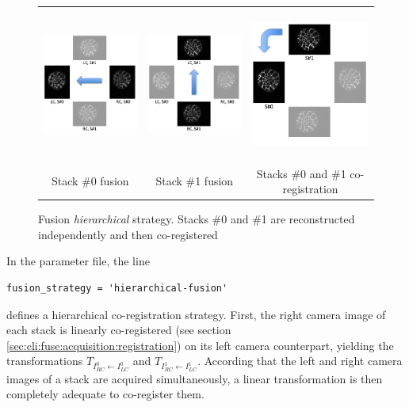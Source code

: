 \begin{figure}
\begin{center}
\begin{tabular}{ccc}
\includegraphics[height=50mm]{figures/fusion-hierarchical-strategy-1.png} &
\includegraphics[height=50mm]{figures/fusion-hierarchical-strategy-2.png} &
\includegraphics[height=50mm]{figures/fusion-hierarchical-strategy-3.png} \\
Stack \#0 fusion &
Stack \#1 fusion &
Stacks \#0 and \#1 co-registration
\end{tabular}
\end{center}
\caption{\label{fig:cli:fuse:hierarchical:strategy} Fusion \textit{hierarchical} strategy. Stacks \#0 and \#1 are reconstructed independently and then co-registered}
\end{figure}

In the parameter file, the line
\begin{verbatim}
fusion_strategy = 'hierarchical-fusion'
\end{verbatim}
defines a hierarchical  co-registration  strategy. First, the right camera image of each stack is linearly co-registered (see section \ref{sec:cli:fuse:acquisition:registration}) on its left camera counterpart, yielding the transformations
$T_{I^{0}_{RC} \leftarrow I^{0}_{LC}}$ and
$T_{I^{1}_{RC} \leftarrow I^{1}_{LC}}$.
According that the left and right camera images of a stack are acquired simultaneously, a linear transformation is then completely adequate to co-register them.

